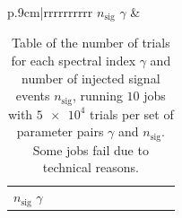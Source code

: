 \begin{table}
  \caption{Table of the number of trials for each spectral index $\gamma$ and number of injected signal events $n_\text{sig}$, running $\num{10}$ jobs with $\num{5e4}$ trials per set of parameter pairs $\gamma$ and $n_\text{sig}$. Some jobs fail due to technical reasons.}
  \label{tab:trials_sig_time_int_table}
  \begin{subtable}{\linewidth}
  \centering
  \begin{tabular}{p{.9cm}|rrrrrrrrrr}
    \toprule
    \: $n_\text{sig}$ \newline $\gamma$ \: & 
    \toprule
    
    \toprule
  \end{tabular}
\end{subtable}
\begin{subtable}{\linewidth}
\centering
  \begin{tabular}{p{.9cm}|rrrrrrrrrr}
    \toprule
    \: $n_\text{sig}$ \newline $\gamma$ \: & 
    \toprule
    
    \toprule
  \end{tabular}
  \end{subtable}
\end{table}
